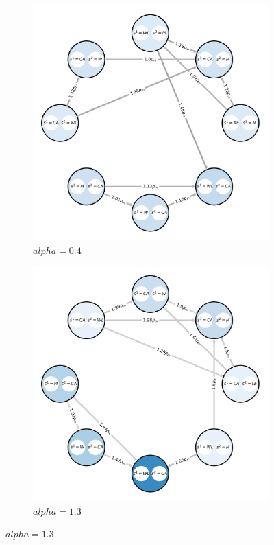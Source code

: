         \begin{figure}[H]
            \centering
            \begin{subfigure}[b]{0.45\linewidth}
                \includegraphics[width=\linewidth]{images/rg_0.4.png}
                \caption{$alpha=0.4$}
                \label{fig:response_graph_0.4}
            \end{subfigure}
            \hfill
            \begin{subfigure}[b]{0.45\linewidth}
                \includegraphics[width=\linewidth]{images/rg_1.3.png}
                \caption{$alpha=1.3$}
                \label{fig:response_graph_1.3}
            \end{subfigure}


\end{figure}
